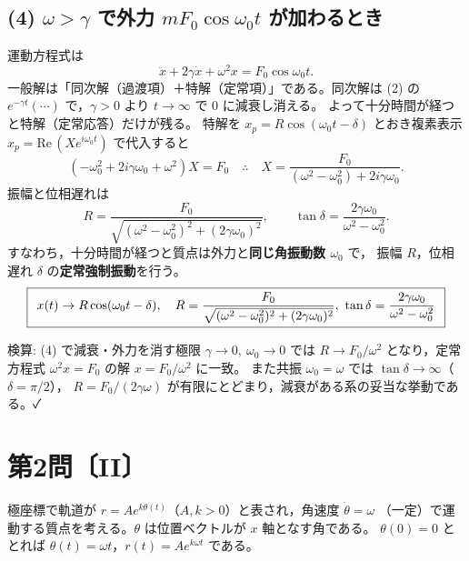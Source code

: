 \documentclass[11pt,a4paper]{article}
\begin{document}
\subsection*{(4) $\omega>\gamma$ で外力 $mF_0\cos\omega_0 t$ が加わるとき}
運動方程式は
\[
  \ddot{x}+2\gamma\dot{x}+\omega^2 x=F_0\cos\omega_0 t .
\]
一般解は「同次解（過渡項）＋特解（定常項）」である。同次解は (2) の
$e^{-\gamma t}(\cdots)$ で，$\gamma>0$ より $t\to\infty$ で $0$ に減衰し消える。
よって十分時間が経つと特解（定常応答）だけが残る。
特解を $x_p=R\cos(\omega_0 t-\delta)$ とおき複素表示 $x_p=\mathrm{Re}\,(Xe^{i\omega_0 t})$
で代入すると
\[
  (-\omega_0^2+2i\gamma\omega_0+\omega^2)X=F_0
  \quad\therefore\quad
  X=\frac{F_0}{(\omega^2-\omega_0^2)+2i\gamma\omega_0}.
\]
振幅と位相遅れは
\[
  R=\frac{F_0}{\sqrt{(\omega^2-\omega_0^2)^2+(2\gamma\omega_0)^2}},\qquad
  \tan\delta=\frac{2\gamma\omega_0}{\omega^2-\omega_0^2}.
\]
すなわち，十分時間が経つと質点は外力と\textbf{同じ角振動数 $\omega_0$} で，
振幅 $R$，位相遅れ $\delta$ の\textbf{定常強制振動}を行う。
\[
  \boxed{\,\;
  x(t)\to R\cos(\omega_0 t-\delta),\quad
  R=\dfrac{F_0}{\sqrt{(\omega^2-\omega_0^2)^2+(2\gamma\omega_0)^2}},\
  \tan\delta=\dfrac{2\gamma\omega_0}{\omega^2-\omega_0^2}\;\,}
\]

\medskip
検算: (4) で減衰・外力を消す極限 $\gamma\to0,\ \omega_0\to0$ では
$R\to F_0/\omega^2$ となり，定常方程式 $\omega^2 x=F_0$ の解 $x=F_0/\omega^2$ に一致。
また共振 $\omega_0=\omega$ では $\tan\delta\to\infty$（$\delta=\pi/2$），
$R=F_0/(2\gamma\omega)$ が有限にとどまり，減衰がある系の妥当な挙動である。✓

\clearpage
\section*{第2問〔II〕}

極座標で軌道が $r=Ae^{k\theta(t)}$（$A,k>0$）と表され，角速度 $\dot\theta=\omega$
（一定）で運動する質点を考える。$\theta$ は位置ベクトルが $x$ 軸となす角である。
$\theta(0)=0$ ととれば $\theta(t)=\omega t$，$r(t)=Ae^{k\omega t}$ である。
\end{document}
